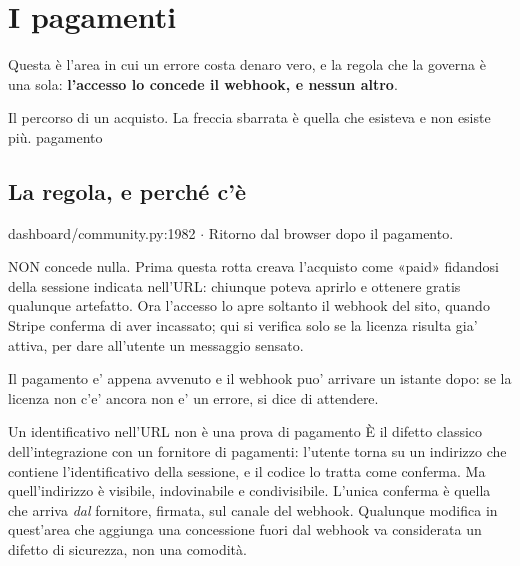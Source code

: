 \section{I pagamenti}\label{sez:pagamenti}

Questa è l'area in cui un errore costa denaro vero, e la regola che la governa
è una sola: \textbf{l'accesso lo concede il webhook, e nessun altro}.

  {Il percorso di un acquisto. La freccia sbarrata è quella che esisteva e non
   esiste più.}
  {pagamento}

\subsection{La regola, e perché c'è}

\begin{commento}{dashboard/community.py:1982 $\cdot$ }
Ritorno dal browser dopo il pagamento.

NON concede nulla. Prima questa rotta creava l'acquisto come «paid»
fidandosi della sessione indicata nell'URL: chiunque poteva aprirlo e
ottenere gratis qualunque artefatto. Ora l'accesso lo apre soltanto il
webhook del sito, quando Stripe conferma di aver incassato; qui si
verifica solo se la licenza risulta gia' attiva, per dare all'utente
un messaggio sensato.

Il pagamento e' appena avvenuto e il webhook puo' arrivare un istante
dopo: se la licenza non c'e' ancora non e' un errore, si dice di
attendere.
\end{commento}

\begin{attenzione}{Un identificativo nell'URL non è una prova di pagamento}
È il difetto classico dell'integrazione con un fornitore di pagamenti:
l'utente torna su un indirizzo che contiene l'identificativo della sessione,
e il codice lo tratta come conferma. Ma quell'indirizzo è visibile,
indovinabile e condivisibile. L'unica conferma è quella che arriva
\emph{dal} fornitore, firmata, sul canale del webhook. Qualunque modifica in
quest'area che aggiunga una concessione fuori dal webhook va considerata un
difetto di sicurezza, non una comodità.
\end{attenzione}

